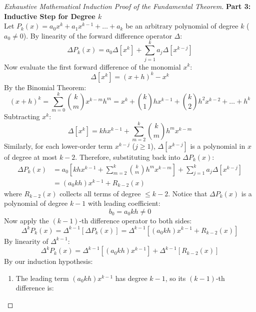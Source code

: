 \begin{proof}[Exhaustive Mathematical Induction Proof of the Fundamental Theorem]
\medskip
\noindent\textbf{Part 3: Inductive Step for Degree $k$} \\
Let $P_k(x) = a_0 x^k + a_1 x^{k-1} + \dots + a_k$ be an arbitrary polynomial of degree $k$ ($a_0 \ne 0$).
By linearity of the forward difference operator $\Delta$:
\begin{equation}
    \Delta P_k(x) = a_0 \Delta [x^k] + \sum_{j=1}^k a_j \Delta [x^{k-j}]
\end{equation}
Now evaluate the first forward difference of the monomial $x^k$:
\begin{equation}
    \Delta [x^k] = (x + h)^k - x^k
\end{equation}
By the Binomial Theorem:
\begin{equation}
    (x + h)^k = \sum_{m=0}^k \binom{k}{m} x^{k-m} h^m = x^k + \binom{k}{1} h x^{k-1} + \binom{k}{2} h^2 x^{k-2} + \dots + h^k
\end{equation}
Subtracting $x^k$:
\begin{equation}
    \Delta [x^k] = k h x^{k-1} + \sum_{m=2}^k \binom{k}{m} h^m x^{k-m}
\end{equation}
Similarly, for each lower-order term $x^{k-j}$ ($j \ge 1$), $\Delta [x^{k-j}]$ is a polynomial in $x$ of degree at most $k - 2$.
Therefore, substituting back into $\Delta P_k(x)$:
\begin{align}
    \Delta P_k(x) &= a_0 \left[ k h x^{k-1} + \sum_{m=2}^k \binom{k}{m} h^m x^{k-m} \right] + \sum_{j=1}^k a_j \Delta [x^{k-j}] \nonumber \\
    &= (a_0 k h) x^{k-1} + R_{k-2}(x)
\end{align}
where $R_{k-2}(x)$ collects all terms of degree $\le k - 2$.
Notice that $\Delta P_k(x)$ is a polynomial of degree $k - 1$ with leading coefficient:
\begin{equation}
    b_0 = a_0 k h \ne 0
\end{equation}
Now apply the $(k - 1)$-th difference operator to both sides:
\begin{equation}
    \Delta^k P_k(x) = \Delta^{k-1}[\Delta P_k(x)] = \Delta^{k-1}\left[ (a_0 k h) x^{k-1} + R_{k-2}(x) \right]
\end{equation}
By linearity of $\Delta^{k-1}$:
\begin{equation}
    \Delta^k P_k(x) = \Delta^{k-1}[(a_0 k h) x^{k-1}] + \Delta^{k-1}[R_{k-2}(x)]
\end{equation}
By our induction hypothesis:
\begin{enumerate}
    \item The leading term $(a_0 k h) x^{k-1}$ has degree $k - 1$, so its $(k-1)$-th difference is:

\end{enumerate}
\end{proof}
